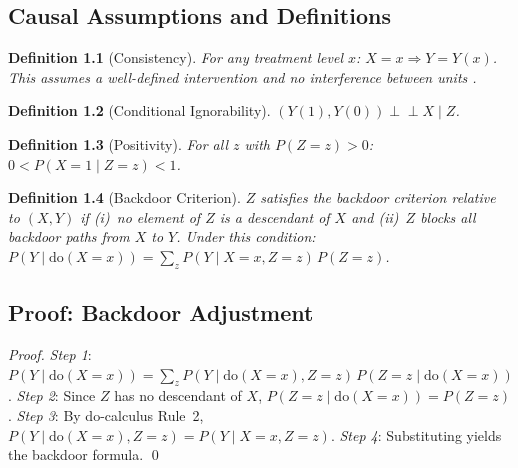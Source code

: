 \documentclass[12pt,a4paper]{report}
\newtheorem{definition}{Definition}[chapter]
\begin{document}


\begin{appendices}

\chapter{Causal Assumptions and Definitions}
\label{app:defs}

\begin{definition}[Consistency]
\label{def:consistency}
For any treatment level $x$: $X=x \Rightarrow Y=Y(x)$. This assumes a well-defined
intervention and no interference between units \citep{neal_causal_notes}.
\end{definition}

\begin{definition}[Conditional Ignorability]
\label{def:cond_ignorability}
$(Y(1),Y(0))\perp\!\!\!\perp X \mid Z$.
\end{definition}

\begin{definition}[Positivity]
\label{def:positivity}
For all $z$ with $P(Z=z)>0$: $0<P(X=1\mid Z=z)<1$.
\end{definition}

\begin{definition}[Backdoor Criterion]
\label{def:backdoor}
$Z$ satisfies the backdoor criterion relative to $(X,Y)$ if (i)~no element of $Z$
is a descendant of $X$ and (ii)~$Z$ blocks all backdoor paths from $X$ to $Y$.
Under this condition:
$P(Y\mid\mathrm{do}(X=x))=\sum_z P(Y\mid X=x,Z=z)\,P(Z=z)$.
\end{definition}

\section*{Proof: Backdoor Adjustment}
\begin{proof}
\emph{Step 1}: $P(Y\mid\mathrm{do}(X=x))=\sum_z P(Y\mid\mathrm{do}(X=x),Z=z)\,P(Z=z\mid\mathrm{do}(X=x))$.
\emph{Step 2}: Since $Z$ has no descendant of $X$, $P(Z=z\mid\mathrm{do}(X=x))=P(Z=z)$.
\emph{Step 3}: By do-calculus Rule~2, $P(Y\mid\mathrm{do}(X=x),Z=z)=P(Y\mid X=x,Z=z)$.
\emph{Step 4}: Substituting yields the backdoor formula. \qed
\end{proof}


\end{appendices}
\end{document}
